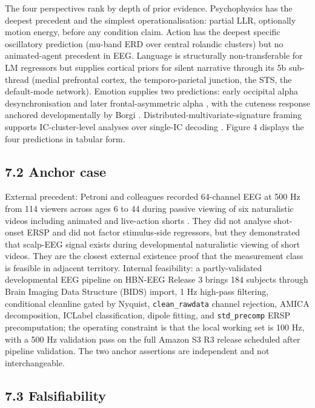 \documentclass[preprint,12pt]{elsarticle}
\begin{document}
The four perspectives rank by depth of prior evidence. Psychophysics has the deepest precedent and the simplest operationalisation: partial LLR, optionally motion energy, before any condition claim. Action has the deepest specific oscillatory prediction (mu-band ERD over central rolandic clusters) but no animated-agent precedent in EEG. Language is structurally non-transferable for LM regressors but supplies cortical priors for silent narrative through its 5b sub-thread (medial prefrontal cortex, the temporo-parietal junction, the STS, the default-mode network). Emotion supplies two predictions: early occipital alpha desynchronisation \cite{Codispoti2023AlphabandOA,Kragel2018EmotionSA} and later frontal-asymmetric alpha \cite{Davidson2000AffectiveSP}, with the cuteness response anchored developmentally by Borgi \cite{Borgi2014BabySI}. Distributed-multivariate-signature framing supports IC-cluster-level analyses over single-IC decoding \cite{Lindquist2012TheBB,chen2017shared}. Figure 4 displays the four predictions in tabular form.

\subsection{7.2 Anchor case}

External precedent: Petroni and colleagues recorded 64-channel EEG at 500 Hz from 114 viewers across ages 6 to 44 during passive viewing of six naturalistic videos including animated and live-action shorts \cite{Petroni2018TheVO}. They did not analyse shot-onset ERSP and did not factor stimulus-side regressors, but they demonstrated that scalp-EEG signal exists during developmental naturalistic viewing of short videos. They are the closest external existence proof that the measurement class is feasible in adjacent territory. Internal feasibility: a partly-validated developmental EEG pipeline on HBN-EEG Release 3 brings 184 subjects through Brain Imaging Data Structure (BIDS) import, 1 Hz high-pass filtering, conditional cleanline gated by Nyquist, \texttt{clean\_rawdata} channel rejection, AMICA decomposition, ICLabel classification, dipole fitting, and \texttt{std\_precomp} ERSP precomputation; the operating constraint is that the local working set is 100 Hz, with a 500 Hz validation pass on the full Amazon S3 R3 release scheduled after pipeline validation. The two anchor assertions are independent and not interchangeable.

\subsection{7.3 Falsifiability}
\end{document}
